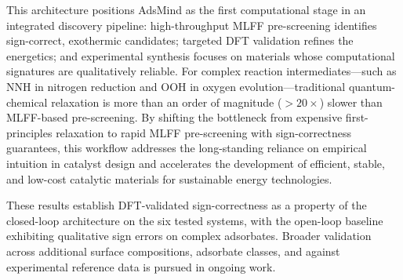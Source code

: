 This architecture positions AdsMind as the first computational stage in an integrated discovery pipeline: high-throughput MLFF pre-screening identifies sign-correct, exothermic candidates; targeted DFT validation refines the energetics; and experimental synthesis focuses on materials whose computational signatures are qualitatively reliable.
For complex reaction intermediates---such as NNH in nitrogen reduction and OOH in oxygen evolution---traditional quantum-chemical relaxation is more than an order of magnitude ($>20\times$) slower than MLFF-based pre-screening.
By shifting the bottleneck from expensive first-principles relaxation to rapid MLFF pre-screening with sign-correctness guarantees, this workflow addresses the long-standing reliance on empirical intuition in catalyst design and accelerates the development of efficient, stable, and low-cost catalytic materials for sustainable energy technologies.

These results establish DFT-validated sign-correctness as a property of the closed-loop architecture on the six tested systems, with the open-loop baseline exhibiting qualitative sign errors on complex adsorbates. Broader validation across additional surface compositions, adsorbate classes, and against experimental reference data is pursued in ongoing work.